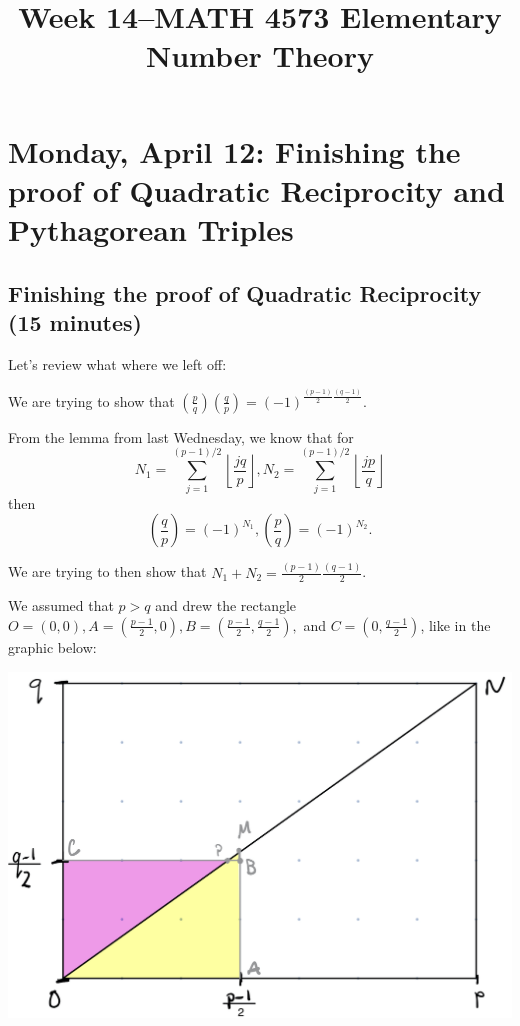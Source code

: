 \documentclass[letterpaper, 11 pt]{article}
\title{Week 14--MATH 4573 Elementary Number Theory}
\begin{document}
\maketitle
\tableofcontents
\section{Monday, April 12: Finishing the proof of Quadratic Reciprocity and Pythagorean Triples}

\subsection{Finishing the proof of Quadratic Reciprocity (15 minutes)}
Let's review what where we left off: 

We are trying to show that $\left(\frac{p}{q}\right)\left(\frac{q}{p}\right)=(-1)^{\frac{(p-1)}{2}\frac{(q-1)}{2}}$.

From the lemma from last Wednesday, we know that for \[N_1=\sum_{j=1}^{(p-1)/2}\left\lfloor\frac{jq}{p}\right\rfloor, N_2=\sum_{j=1}^{(p-1)/2}\left\lfloor\frac{jp}{q}\right\rfloor\] then \[\left(\frac{q}{p}\right)=(-1)^{N_1}, \left(\frac{p}{q}\right)=(-1)^{N_2}.\]

We are trying to then show that $N_1+N_2=\frac{(p-1)}{2}\frac{(q-1)}{2}$.

We assumed that $p>q$ and drew the rectangle 
$O=(0,0), A=\left(\frac{p-1}{2},0\right), B=\left(\frac{p-1}{2},\frac{q-1}{2}\right),$ and $C=\left(0,\frac{q-1}{2}\right)$, like in the graphic below:

\includegraphics[width=\textwidth]{lattice}
\end{document}
